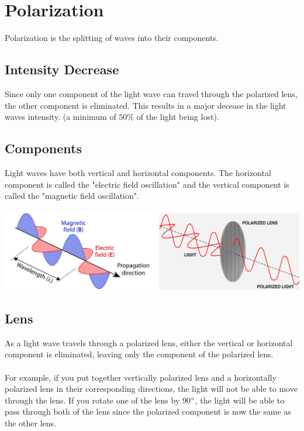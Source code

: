 \documentclass{article}
\begin{document}
\section{Polarization}
Polarization is the splitting of waves into their components.

\subsection{Intensity Decrease}
Since only one component of the light wave can travel through the polarized lens, the other component is eliminated. This results in a major decease in the light waves intensity. (a minimum of $50\%$ of the light being lost).

\subsection{Components}
Light waves have both vertical and horizontal components. The horizontal component is called the "electric field oscillation" and the vertical component is called the "magnetic field oscillation".\\\\
\includegraphics[scale=0.45]{images/polarization} \\

\vspace{4cm}

\subsection{Lens}
\noindent As a light wave travels through a polarized lens, either the vertical or horizontal component is eliminated, leaving only the component of the polarized lens.\\\\
For example, if you put together vertically polarized lens and a horizontally polarized lens in their corresponding directions, the light will not be able to move through the lens.
If you rotate one of the lens by 90$\degree$, the light will be able to pass through both of the lens since the polarized component is now the same as the other lens.
\end{document}

